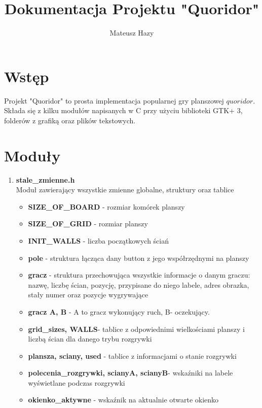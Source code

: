 \documentclass{article}
\title{Dokumentacja Projektu "Quoridor"}
\author{Mateusz Hazy}
\newcommand{\akapit}{\hspace{0.5cm}}
\newcommand{\g}[1]{\textbf{#1}}
\begin{document}
	\maketitle
	\section*{Wstęp}
		\akapit Projekt "Quoridor" to prosta implementacja popularnej gry planszowej $quoridor$. Składa się z kilku modułów napisanych w C przy użyciu biblioteki GTK+ 3, folderów z grafiką oraz plików tekstowych.
	\section*{Moduły}
		\begin{enumerate}
			\item \textbf{stale\_zmienne.h} \\
			Moduł zawierający wszystkie zmienne globalne, struktury oraz tablice
			\begin{itemize}
				\item \g{SIZE\_OF\_BOARD} - rozmiar komórek planszy
				\item  \g{SIZE\_OF\_GRID} - rozmiar planszy
				\item \g{INIT\_WALLS} - liczba początkowych ściań
				\item \g{pole} - struktura łącząca dany button z jego współrzędnymi na 								planszy
				\item \g{gracz} - struktura przechowująca wszystkie informacje o danym graczu: nazwę, liczbę ścian, pozycję, przypisane do niego labele, adres obrazka, stały numer oraz pozycje wygrywające
				\item \g{gracz A, B} - A to gracz wykonujący ruch, B- oczekujący.
				\item \g{grid\_sizes, WALLS}- tablice z odpowiednimi wielkościami planszy i 						liczbą ścian dla danego trybu rozgrywki
				\item \g{plansza, sciany, used} - tablice z informacjami o stanie rozgrywki
				\item \g{polecenia\_rozgrywki, scianyA, scianyB}- wskaźniki na labele 									wyświetlane podczas rozgrywki
				\item \g{okienko\_aktywne} - wskaźnik na aktualnie otwarte okienko
				

\end{itemize}
\end{enumerate}
\end{document}

